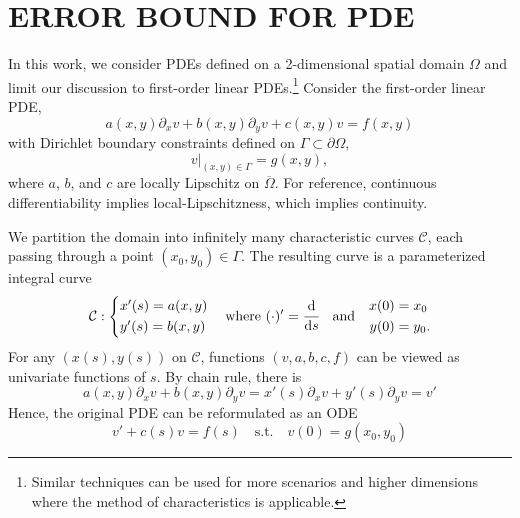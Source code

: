 \documentclass[accepted]{uai2023}
\newcommand{\ds}[1]{\cfrac{\mathrm{d} #1}{\mathrm{d} s}}
\begin{document}
\section{ERROR BOUND FOR PDE} \label{section:error-bound-for-pde}
    In this work, we consider PDEs defined on a 2-dimensional spatial domain $\Omega$ and limit our discussion to first-order linear PDEs.\footnote{Similar techniques can be used for more scenarios and higher dimensions where the method of characteristics is applicable.} 
    Consider the first-order linear PDE,
    { 
        \small
        \begin{equation}\label{eq:pde-master}
            a(x, y) \partial_x v + b(x, y) \partial_y v + c(x, y)v = f(x, y)
        \end{equation}
    }
    with Dirichlet boundary constraints defined on $\Gamma \subset \partial \Omega$,
    {
        \small
        \begin{equation}\label{eq:pde-bc-master}
            v\big|_{(x, y) \in \Gamma} = g(x, y),
        \end{equation}
    }
    where $a$, $b$, and $c$ are locally Lipschitz on $\overline\Omega$. For reference, continuous differentiability implies local-Lipschitzness, which implies continuity.

    We partition the domain into infinitely many characteristic curves $\mathcal{C}$, each passing through a point $(x_0, y_0) \in \Gamma$. The resulting curve is a parameterized integral curve 
    {
        \small
        \begin{equation*} 
            \mathcal{C}: \begin{cases*}
                x'(s) = a(x, y) \\
                y'(s) = b(x, y) 
            \end{cases*} 
            \quad
            \text{where}
            \,\,
            (\cdot)' = \ds{}
            \quad
            \text{and} 
            \quad
            \begin{aligned}
                x(0) &= x_0 \\
                y(0) &= y_0.
            \end{aligned}
        \end{equation*}
    }
    For any $(x(s), y(s))$ on $\mathcal{C}$, functions $(v, a, b, c, f)$ can be viewed as univariate functions of $s$. By chain rule, there is
    {
        \small
        \begin{equation*}
            a(x, y)\partial_x v + b(x, y)\partial_y v = x'(s)\partial_x v  + y'(s)\partial_y v = v'
        \end{equation*}
    }
    Hence, the original PDE can be reformulated as an ODE
    {
        \small
        \begin{equation}
            v' + c(s)v = f(s) \quad \text{s.t.} \quad v(0) = g(x_0, y_0)
        \end{equation}
    }
\end{document}
